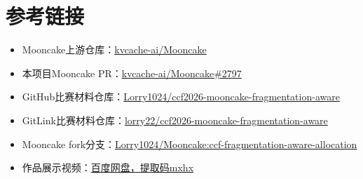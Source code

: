 \documentclass[UTF8,zihao=-4,a4paper]{ctexart}
\begin{document}
\section{参考链接}

\begin{itemize}
  \item Mooncake上游仓库：\href{https://github.com/kvcache-ai/Mooncake}{kvcache-ai/Mooncake}
  \item 本项目Mooncake PR：\href{https://github.com/kvcache-ai/Mooncake/pull/2797}{kvcache-ai/Mooncake\#2797}
  \item GitHub比赛材料仓库：\href{https://github.com/Lorry1024/ccf2026-mooncake-fragmentation-aware}{Lorry1024/ccf2026-mooncake-fragmentation-aware}
  \item GitLink比赛材料仓库：\href{https://gitlink.org.cn/lorry22/ccf2026-mooncake-fragmentation-aware}{lorry22/ccf2026-mooncake-fragmentation-aware}
  \item Mooncake fork分支：\href{https://github.com/Lorry1024/Mooncake/tree/ccf-fragmentation-aware-allocation}{Lorry1024/Mooncake:ccf-fragmentation-aware-allocation}
  \item 作品展示视频：\href{https://pan.baidu.com/s/1v2-jxHSaDi0RlagPGrLAiw?pwd=mxhx}{百度网盘，提取码mxhx}
\end{itemize}
\end{document}
